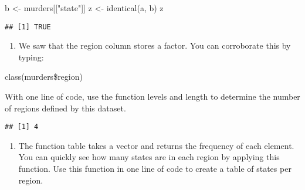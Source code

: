 \documentclass[
]{article}
\newenvironment{Shaded}{\begin{snugshade}}{\end{snugshade}}
\newcommand{\FunctionTok}[1]{\textcolor[rgb]{0.00,0.00,0.00}{#1}}
\newcommand{\NormalTok}[1]{#1}
\newcommand{\OtherTok}[1]{\textcolor[rgb]{0.56,0.35,0.01}{#1}}
\newcommand{\SpecialCharTok}[1]{\textcolor[rgb]{0.00,0.00,0.00}{#1}}
\newcommand{\StringTok}[1]{\textcolor[rgb]{0.31,0.60,0.02}{#1}}
\providecommand{\tightlist}{%
  \setlength{\itemsep}{0pt}\setlength{\parskip}{0pt}}
\begin{document}
\begin{Shaded}
\begin{Highlighting}[]
\NormalTok{b }\OtherTok{\textless{}{-}}\NormalTok{ murders[[}\StringTok{"state"}\NormalTok{]] }
\NormalTok{z }\OtherTok{\textless{}{-}} \FunctionTok{identical}\NormalTok{(a, b)}
\NormalTok{z}
\end{Highlighting}
\end{Shaded}

\begin{verbatim}
## [1] TRUE
\end{verbatim}

\begin{enumerate}
\def\labelenumi{\arabic{enumi}.}
\setcounter{enumi}{4}
\tightlist
\item
  We saw that the region column stores a factor. You can corroborate
  this by typing:
\end{enumerate}

class(murders\$region)

With one line of code, use the function levels and length to determine
the number of regions defined by this dataset.

\begin{Shaded}
\end{Shaded}

\begin{verbatim}
## [1] 4
\end{verbatim}

\begin{enumerate}
\def\labelenumi{\arabic{enumi}.}
\setcounter{enumi}{5}
\tightlist
\item
  The function table takes a vector and returns the frequency of each
  element. You can quickly see how many states are in each region by
  applying this function. Use this function in one line of code to
  create a table of states per region.
\end{enumerate}

\begin{Shaded}
\end{Shaded}
\end{document}
